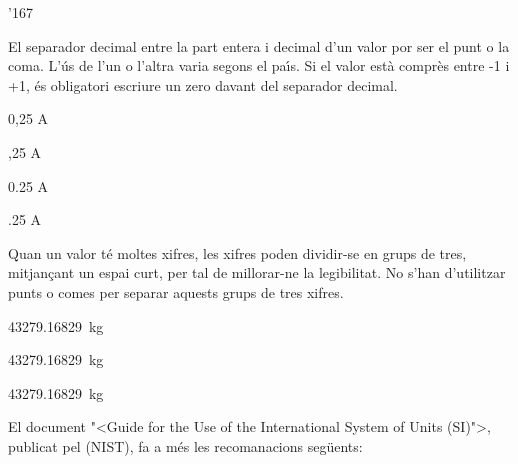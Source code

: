 \begin{dinglist}{'167}
\item El separador decimal entre la part entera i decimal d'un valor por ser el punt o la coma. L'\'{u}s de l'un o l'altra varia segons el pa\'{\i}s. Si el valor est\`{a} compr\`{e}s entre -1 i +1, \'{e}s obligatori escriure un zero davant del separador decimal.

\textcolor{Green}{} 0,25 A

\textcolor{Red}{}  ,25 A

\textcolor{Green}{} 0.25 A

\textcolor{Red}{}  .25 A


\item Quan un valor t\'{e} moltes xifres, les xifres poden dividir-se en grups de tres, mitjan\c{c}ant un espai curt, per tal de millorar-ne la legibilitat. No s'han d'utilitzar punts o comes per separar aquests grups de tres xifres.

\textcolor{Green}{} \SI{43279,16829}{kg}

\textcolor{Green}{} \SI[group-separator =]{43279,16829}{kg}

\textcolor{Red}{}  \SI[group-separator = .]{43279,16829}{kg}

\end{dinglist}

El document  {"<}Guide for the Use of the International System of Units (SI){">}, publicat pel (\textsf{NIST}),  fa a m\'{e}s les recomanacions seg\"{u}ents:

